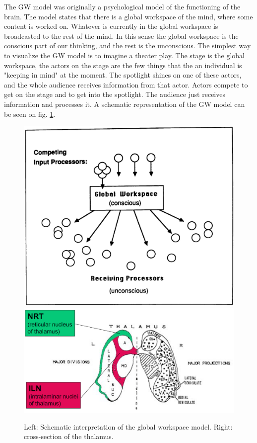 \documentclass [12pt,a4paper,twoside]{article}
\begin{document}
The GW model was originally a psychological model of the functioning of the brain. The model states that there is a global workspace of the mind, where some content is worked on. Whatever is currently in the global workspace is broadcasted to the rest of the mind. In this sense the global workspace is the conscious part of our thinking, and the rest is the unconscious. The simplest way to visualize the GW model is to imagine a theater play. The stage is the global workspace, the actors on the stage are the few things that the an individual is "keeping in mind" at the moment. The spotlight shines on one of these actors, and the whole audience receives information from that actor. Actors compete to get on the stage and to get into the spotlight. The audience just receives information and processes it. A schematic representation of the GW model can be seen on fig. \ref{global_workspace}.

\begin{figure}[h!]
  \centering
  \includegraphics[width=0.45\linewidth]{report/GW_schematic.jpg}
  \includegraphics[width=0.54\linewidth]{report/thalamus.png}
  \caption{Left: Schematic interpretation of the global workspace model. Right: cross-section of the thalamus.}
  \label{global_workspace}
\end{figure}
\end{document}
